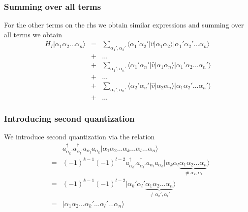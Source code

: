 \documentclass{beamer}
\begin{document}
\begin{frame}
\frametitle{Summing over all terms}

For the other terms on the rhs we obtain similar expressions  and summing over all terms we obtain
\begin{align}
	H_I |\alpha_1\alpha_2\dots\alpha_n\rangle &=& \sum_{\alpha_1', \alpha_2'} \langle \alpha_1'\alpha_2'|\hat{v}|\alpha_1\alpha_2\rangle
		|\alpha_1'\alpha_2'\dots\alpha_n\rangle \nonumber \\
	&+& \dots \nonumber \\
	&+& \sum_{\alpha_1', \alpha_n'} \langle \alpha_1'\alpha_n'|\hat{v}|\alpha_1\alpha_n\rangle
		|\alpha_1'\alpha_2\dots\alpha_n'\rangle \nonumber \\
	&+& \dots \nonumber \\
	&+& \sum_{\alpha_2', \alpha_n'} \langle \alpha_2'\alpha_n'|\hat{v}|\alpha_2\alpha_n\rangle
		|\alpha_1\alpha_2'\dots\alpha_n'\rangle \nonumber \\
	 &+& \dots \label{eq:2-34}
\end{align}
\end{frame}

\begin{frame}
\frametitle{Introducing second quantization}

We introduce second quantization via the relation
\begin{align}
	&& a_{\alpha_k'}^{\dagger} a_{\alpha_l'}^{\dagger} a_{\alpha_l} a_{\alpha_k} 
		|\alpha_1\alpha_2\dots\alpha_k\dots\alpha_l\dots\alpha_n\rangle \nonumber \\
	&=& (-1)^{k-1} (-1)^{l-2} a_{\alpha_k'}^{\dagger} a_{\alpha_l'}^{\dagger} a_{\alpha_l} a_{\alpha_k}
		|\alpha_k\alpha_l \underbrace{\alpha_1\alpha_2\dots\alpha_n}_{\neq \alpha_k,\alpha_l}\rangle \nonumber \\
	&=& (-1)^{k-1} (-1)^{l-2} 
	|\alpha_k'\alpha_l' \underbrace{\alpha_1\alpha_2\dots\alpha_n}_{\neq \alpha_k',\alpha_l'}\rangle \nonumber \\
	&=& |\alpha_1\alpha_2\dots\alpha_k'\dots\alpha_l'\dots\alpha_n\rangle \label{eq:2-35}
\end{align}
\end{frame}
\end{document}

